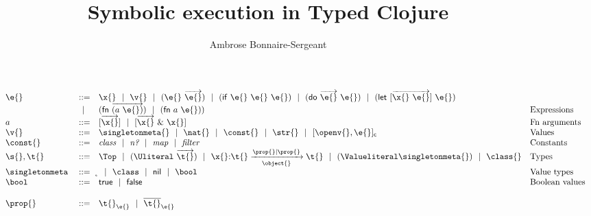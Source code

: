 \documentclass[9pt]{extarticle}
\title{Symbolic execution in Typed Clojure}
\author{Ambrose Bonnaire-Sergeant}
\begin{document}
\maketitle

\begin{abstract}
\end{abstract}



\begin{figure}[t!]
$$
\begin{array}{lrll}
  \e{} &::=& \x{}
                      \alt \v{} 
                      \alt {\comb {\e{}} {\overrightarrow{\e{}}}}
                      \alt {\ifexp {\e{}} {\e{}} {\e{}}}
                      \alt {\doexp {\overrightarrow{\e{}}} {\e{}}}
                      \alt {\letexpmany {\overrightarrow{\x{}\ {\e{}}}} {\e{}}}
                      \\&\alt&
                      {\fnexp {\overrightarrow{(a\ \e{})}}}
                      \alt
                      {\fnexp {a\ \e{})}}
                      &\mbox{Expressions} \\
  a &::=& [\overrightarrow{\x{}}]
          \alt [\overrightarrow{\x{}}\ \&\ \x{}]
                      &\mbox{Fn arguments} \\
  \v{} &::=&          \singletonmeta{}
                      \alt {\nat{}}
                      \alt {\const{}}
                      \alt {\str{}}
                      \alt {\closure {\openv{}} {\e{}}}
                &\mbox{Values} \\
  {\const{}}           &::=& \classconst \alt \numberhuh \alt \mapconst \alt \filterconst
                &\mbox{Constants}\\
  \s{}, \t{}    &::=& \Top 
                      \alt {\Unionsplice {\overrightarrow{\t{}}}}
                      \alt
                      {\ArrowOne {\x{}} {\t{}}
                                   {\t{}}
                                   {\filterset {\prop{}} {\prop{}}}
                                   {\object{}}}
                      \alt {\Value \singletonmeta{}} 
                      \alt {\class{}}
                &\mbox{Types} \\
  \singletonallsyntax{}
                \\ \\
  \prop{}       &::=& {\isprop {\t{}} {\e{}}}
                      \alt {\notprop {\t{}} {\e{}}}

\end{array}$$
\end{figure}
\end{document}
